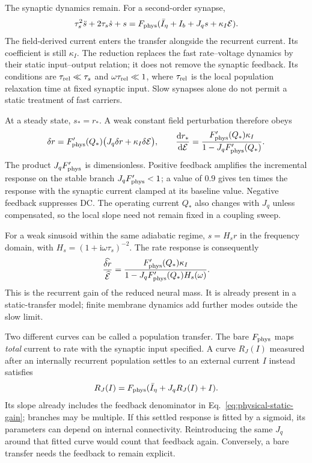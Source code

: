 \documentclass[11pt,a4paper]{article}
\newcommand{\ii}{\mathrm i}
\newcommand{\dd}{\mathrm d}
\newcommand{\E}{\mathcal E}
\begin{document}
The synaptic dynamics remain. For a second-order synapse,
\begin{equation}
\tau_s^2\ddot s+2\tau_s\dot s+s
=F_{\rm phys}(\bar I_\eta+I_b+J_qs+\kappa_I\E).
\label{eq:physical-slow}
\end{equation}
The field-derived current enters the transfer alongside the recurrent current. Its coefficient is still $\kappa_I$. The reduction replaces the fast rate--voltage dynamics by their static input--output relation; it does not remove the synaptic feedback. Its conditions are $\tau_{\rm rel}\ll\tau_s$ and $\omega\tau_{\rm rel}\ll1$, where $\tau_{\rm rel}$ is the local population relaxation time at fixed synaptic input. Slow synapses alone do not permit a static treatment of fast carriers.

At a steady state, $s_*=r_*$. A weak constant field perturbation therefore obeys
\begin{equation}
\delta r=F_{\rm phys}'(Q_*)\big(J_q\delta r+\kappa_I\delta\E\big),
\qquad
\frac{\dd r_*}{\dd\E}
=\frac{F_{\rm phys}'(Q_*)\kappa_I}
{1-J_qF_{\rm phys}'(Q_*)}.
\label{eq:physical-static-gain}
\end{equation}
The product $J_qF_{\rm phys}'$ is dimensionless. Positive feedback amplifies the incremental response on the stable branch $J_qF_{\rm phys}'<1$; a value of $0.9$ gives ten times the response with the synaptic current clamped at its baseline value. Negative feedback suppresses DC. The operating current $Q_*$ also changes with $J_q$ unless compensated, so the local slope need not remain fixed in a coupling sweep.

For a weak sinusoid within the same adiabatic regime, $s=H_sr$ in the frequency domain, with $H_s=(1+\ii\omega\tau_s)^{-2}$. The rate response is consequently
\begin{equation}
\frac{\widehat{\delta r}}{\widehat{\E}}
=\frac{F_{\rm phys}'(Q_*)\kappa_I}
{1-J_qF_{\rm phys}'(Q_*)H_s(\omega)}.
\label{eq:physical-slow-frequency}
\end{equation}
This is the recurrent gain of the reduced neural mass. It is already present in a static-transfer model; finite membrane dynamics add further modes outside the slow limit.

Two different curves can be called a population transfer. The bare $F_{\rm phys}$ maps \emph{total} current to rate with the synaptic input specified. A curve $R_J(I)$ measured after an internally recurrent population settles to an external current $I$ instead satisfies
\begin{equation}
R_J(I)=F_{\rm phys}(\bar I_\eta+J_qR_J(I)+I).
\end{equation}
Its slope already includes the feedback denominator in Eq.~\eqref{eq:physical-static-gain}; branches may be multiple. If this settled response is fitted by a sigmoid, its parameters can depend on internal connectivity. Reintroducing the same $J_q$ around that fitted curve would count that feedback again. Conversely, a bare transfer needs the feedback to remain explicit.
\end{document}
